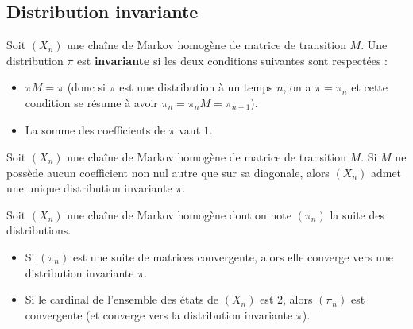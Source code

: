 	\subsection{Distribution invariante}

	\begin{formula}[Définition]
		Soit $(X_n)$ une chaîne de Markov homogène de matrice de transition $M$. Une distribution $\pi$ est \textbf{invariante} si les deux conditions suivantes sont respectées :
		\begin{itemize}
			\item $\displaystyle{\pi M = \pi}$ (donc si $\pi$ est une distribution à un temps $n$, on a $\pi = \pi_n$ et cette condition se résume à avoir $\pi_n = \pi_n M = \pi_{n+1}$).
			\item La somme des coefficients de $\pi$ vaut $1$.
		\end{itemize}
	\end{formula}

	\begin{formula}
		Soit $(X_n)$ une chaîne de Markov homogène de matrice de transition $M$.
		\newpar
		Si $M$ ne possède aucun coefficient non nul autre que sur sa diagonale, alors $(X_n)$ admet une unique distribution invariante $\pi$.
	\end{formula}

	\begin{formula}
		Soit $(X_n)$ une chaîne de Markov homogène dont on note $(\pi_n)$ la suite des distributions.
		\begin{itemize}
			\item Si $(\pi_n)$ est une suite de matrices convergente, alors elle converge vers une distribution invariante $\pi$.
			\item Si le cardinal de l'ensemble des états de $(X_n)$ est $2$, alors $(\pi_n)$ est convergente (et converge vers la distribution invariante $\pi$).
		\end{itemize}
	\end{formula}

